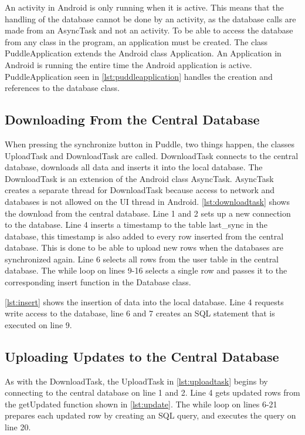 An activity in Android is only running when it is active. This means that the handling of the database cannot be done by an activity, as the database calls are made from an AsyncTask \cite{asynctask} and not an activity. To be able to access the database from any class in the program, an application must be created. The class PuddleApplication extends the Android class Application. An Application in Android is running the entire time the Android application is active. PuddleApplication seen in \autoref{lst:puddleapplication} handles the creation and references to the database class.



\subsection{Downloading From the Central Database}
When pressing the synchronize button in Puddle, two things happen, the classes UploadTask and DownloadTask are called. DownloadTask connects to the central database, downloads all data and inserts it into the local database. The DownloadTask is an extension of the Android class AsyncTask. AsyncTask creates a separate thread for DownloadTask because access to network and databases is not allowed on the UI thread in Android.
\autoref{lst:downloadtask} shows the download from the central database. Line 1 and 2 sets up a new connection to the database. Line 4 inserts a timestamp to the table last\_sync in the database, this timestamp is also added to every row inserted from the central database. This is done to be able to upload new rows when the databases are synchronized again. Line 6 selects all rows from the user table in the central database. The while loop on lines 9-16 selects a single row and passes it to the corresponding insert function in the Database class.



\autoref{lst:insert} shows the insertion of data into the local database. Line 4 requests write access to the database, line 6 and 7 creates an SQL statement that is executed on line 9.



\subsection{Uploading Updates to the Central Database}
As with the DownloadTask, the UploadTask in \autoref{lst:uploadtask} begins by connecting to the central database on line 1 and 2. Line 4 gets updated rows from the getUpdated function shown in \autoref{lst:update}. The while loop on lines 6-21 prepares each updated row by creating an SQL query, and executes the query on line 20.

